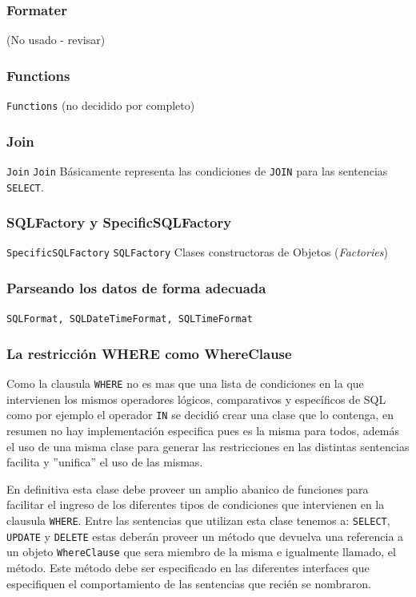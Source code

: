 \subsubsection{Formater}
(No usado - revisar)

\subsubsection{Functions}
\verb=Functions= (no decidido por completo)

\subsubsection{Join}
\verb=Join=
\verb=Join= Básicamente representa las condiciones de \verb=JOIN= para las sentencias \verb=SELECT=.

\subsubsection{SQLFactory y SpecificSQLFactory}
\verb=SpecificSQLFactory=
\verb=SQLFactory=
Clases constructoras de Objetos (\textit{Factories})
\subsubsection{Parseando los datos de forma adecuada}
\verb=SQLFormat, SQLDateTimeFormat, SQLTimeFormat=

\subsubsection{La restricción WHERE como WhereClause}
Como la clausula \verb=WHERE= no es mas que una lista de condiciones en la que intervienen los mismos operadores lógicos, comparativos y específicos de SQL como por ejemplo el operador \verb=IN= se decidió crear una clase que lo contenga, en resumen no hay implementación especifica pues es la misma para todos, además el uso de una misma clase para generar las restricciones en las distintas sentencias facilita y ''unifica'' el uso de las mismas.

En definitiva esta clase debe proveer un amplio abanico de funciones para facilitar el ingreso de los diferentes tipos de condiciones que intervienen en la clausula \verb=WHERE=. Entre las sentencias que utilizan esta clase tenemos a: \verb=SELECT=, \verb=UPDATE= y \verb=DELETE= estas deberán proveer un método que devuelva una referencia a un objeto \verb=WhereClause= que sera miembro de la misma e igualmente llamado, el método. Este método debe ser especificado en las diferentes interfaces que especifiquen el comportamiento de las sentencias que recién se nombraron. 

